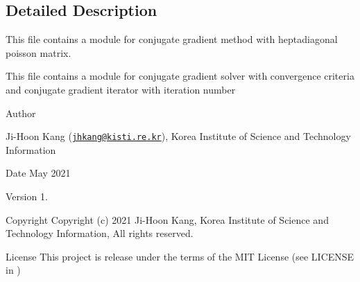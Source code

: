 \subsection{Detailed Description}
This file contains a module for conjugate gradient method with heptadiagonal poisson matrix. 

This file contains a module for conjugate gradient solver with convergence criteria and conjugate gradient iterator with iteration number \begin{DoxyAuthor}{Author}

\begin{DoxyItemize}
\item Ji-\/\+Hoon Kang (\href{mailto:jhkang@kisti.re.kr}{\tt jhkang@kisti.\+re.\+kr}), Korea Institute of Science and Technology Information
\end{DoxyItemize}
\end{DoxyAuthor}
\begin{DoxyDate}{Date}
May 2021 
\end{DoxyDate}
\begin{DoxyVersion}{Version}
1. 
\end{DoxyVersion}
\begin{DoxyParagraph}{Copyright}
Copyright (c) 2021 Ji-\/\+Hoon Kang, Korea Institute of Science and Technology Information, All rights reserved. 
\end{DoxyParagraph}
\begin{DoxyParagraph}{License }
This project is release under the terms of the M\+IT License (see L\+I\+C\+E\+N\+SE in ) 
\end{DoxyParagraph}
